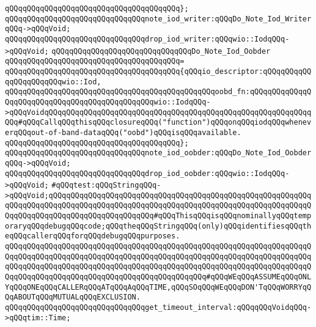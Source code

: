 \verb|qQQqqQQqqQQqqQQqqQQqqQQqqQQqqQQqqQQqqQQq};|\newline
\verb|qQQqqQQqqQQqqQQqqQQqqQQqqQQqqQQqnote_iod_writer:qQQqDo_Note_Iod_WriterqQQq->qQQqVoid;|\newline
\verb|qQQqqQQqqQQqqQQqqQQqqQQqqQQqqQQqdrop_iod_writer:qQQqwio::IodqQQq->qQQqVoid;|\newline
\newline
\newline
\verb|qQQqqQQqqQQqqQQqqQQqqQQqqQQqqQQqDo_Note_Iod_Oobder|\newline
\verb|qQQqqQQqqQQqqQQqqQQqqQQqqQQqqQQqqQQqqQQq=|\newline
\verb|qQQqqQQqqQQqqQQqqQQqqQQqqQQqqQQqqQQqqQQq{qQQqio_descriptor:qQQqqQQqqQQqqQQqqQQqqQQqwio::Iod,|\newline
\verb|qQQqqQQqqQQqqQQqqQQqqQQqqQQqqQQqqQQqqQQqqQQqqQQqoobd_fn:qQQqqQQqqQQqqQQqqQQqqQQqqQQqqQQqqQQqqQQqqQQqqQQqwio::IodqQQq->qQQqVoidqQQqqQQqqQQqqQQqqQQqqQQqqQQqqQQqqQQqqQQqqQQqqQQqqQQqqQQqqQQqqQQq#qQQqCallqQQqthisqQQqclosureqQQq("function")qQQqonqQQqiodqQQqwheneverqQQqout-of-band-dataqQQq("oobd")qQQqisqQQqavailable.|\newline
\verb|qQQqqQQqqQQqqQQqqQQqqQQqqQQqqQQqqQQqqQQq};|\newline
\verb|qQQqqQQqqQQqqQQqqQQqqQQqqQQqqQQqnote_iod_oobder:qQQqDo_Note_Iod_OobderqQQq->qQQqVoid;|\newline
\verb|qQQqqQQqqQQqqQQqqQQqqQQqqQQqqQQqdrop_iod_oobder:qQQqwio::IodqQQq->qQQqVoid;|\newline
\newline
\newline
\verb|#qQQqtest:qQQqStringqQQq->qQQqVoid;qQQqqQQqqQQqqQQqqQQqqQQqqQQqqQQqqQQqqQQqqQQqqQQqqQQqqQQqqQQqqQQqqQQqqQQqqQQqqQQqqQQqqQQqqQQqqQQqqQQqqQQqqQQqqQQqqQQqqQQqqQQqqQQqqQQqqQQqqQQqqQQqqQQqqQQqqQQqqQQqqQQq#qQQqThisqQQqisqQQqnominallyqQQqtemporaryqQQqdebugqQQqcode;qQQqtheqQQqStringqQQq(only)qQQqidentifiesqQQqtheqQQqcallerqQQqforqQQqdebugqQQqpurposes.|\newline
\verb|qQQqqQQqqQQqqQQqqQQqqQQqqQQqqQQqqQQqqQQqqQQqqQQqqQQqqQQqqQQqqQQqqQQqqQQqqQQqqQQqqQQqqQQqqQQqqQQqqQQqqQQqqQQqqQQqqQQqqQQqqQQqqQQqqQQqqQQqqQQqqQQqqQQqqQQqqQQqqQQqqQQqqQQqqQQqqQQqqQQqqQQqqQQqqQQqqQQqqQQqqQQqqQQqqQQqqQQqqQQqqQQqqQQqqQQqqQQqqQQqqQQqqQQqqQQqqQQq#qQQqWEqQQqASSUMEqQQqONLYqQQqONEqQQqCALLERqQQqATqQQqAqQQqTIME,qQQqSOqQQqWEqQQqDON'TqQQqWORRYqQQqABOUTqQQqMUTUALqQQqEXCLUSION.|\newline
\newline
\newline
\verb|qQQqqQQqqQQqqQQqqQQqqQQqqQQqqQQqget_timeout_interval:qQQqqQQqVoidqQQq->qQQqtim::Time;|\newline
